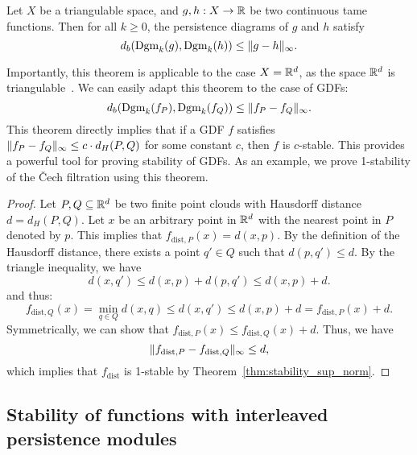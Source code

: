 \begin{theorem}
    \label{thm:stability_sup_norm}
    Let $X$ be a triangulable space, and $g, h : X \to \mathbb{R}$ be two continuous
    tame functions. Then for all $k \geq 0$, the persistence diagrams of $g$ and
    $h$ satisfy
    \begin{equation}
        d_b(\operatorname{Dgm}_k(g), \operatorname{Dgm}_k(h)) \leq \lVert g - h\rVert_{\infty}.
    \end{equation}
\end{theorem}
Importantly, this theorem is applicable to the case $X = \mathbb{R}^d$, as the space
$\mathbb{R}^d$ is triangulable~\cite{moise2013geometric}. We can easily adapt this
theorem to the case of GDFs:
\begin{equation}
    d_b(\operatorname{Dgm}_k(f_P), \operatorname{Dgm}_k(f_Q)) \leq \lVert f_P - f_Q\rVert_{\infty}.
\end{equation}
This theorem directly implies that if a GDF $f$ satisfies
$\lVert f_P - f_Q\rVert_\infty \leq c \cdot d_H(P, Q)$ for some constant $c$, then
$f$ is $c$-stable. This provides a powerful tool for proving stability of GDFs.
As an example, we prove 1-stability of the \v{C}ech filtration using this theorem.
\begin{proof}
    Let $P, Q \subseteq \mathbb{R}^d$ be two finite point clouds with Hausdorff distance
    $d = d_H(P, Q)$. Let $x$ be an arbitrary point in $\mathbb{R}^d$ with the nearest
    point in $P$ denoted by $p$. This implies that $f_{\mathrm{dist}, P}(x) =
    d(x, p)$.  By the definition of the Hausdorff distance, there exists a point
    $q' \in Q$ such that $d(p, q') \leq d$. By the triangle inequality, we have
    \begin{equation}
        d(x, q') \leq d(x, p) + d(p, q') \leq d(x, p) + d.
    \end{equation}
    and thus:
    \begin{equation}
        f_{\mathrm{dist}, Q}(x) = \min_{q \in Q} d(x, q) \leq d(x, q') \leq d(x, p) + d = f_{\mathrm{dist}, P}(x) + d.
    \end{equation}
    Symmetrically, we can show that $f_{\mathrm{dist}, P}(x) \leq f_{\mathrm{dist}, Q}(x) + d$. Thus, we have
    \begin{equation}
        \lVert f_{\mathrm{dist}, P} - f_{\mathrm{dist}, Q}\rVert_\infty \leq d,
    \end{equation}
    which implies that $f_{\mathrm{dist}}$ is 1-stable by Theorem~\ref{thm:stability_sup_norm}.
\end{proof}

\subsection{Stability of functions with interleaved persistence modules}

